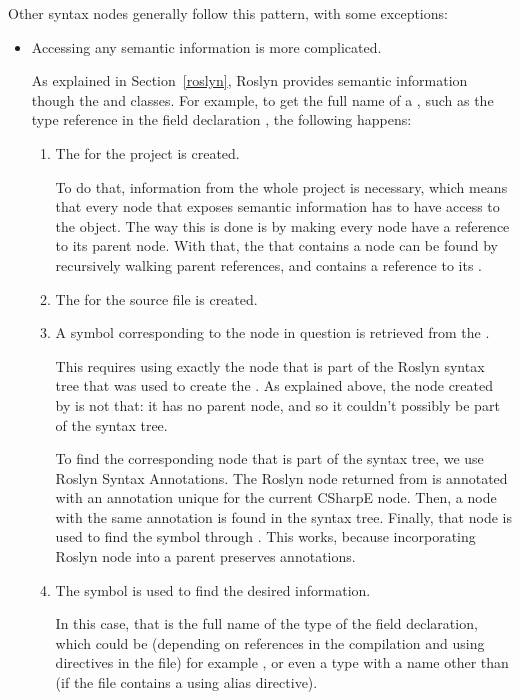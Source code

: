 Other syntax nodes generally follow this pattern, with some exceptions:

\begin{itemize}
\item Accessing any semantic information is more complicated.

As explained in Section~\ref{roslyn}, Roslyn provides semantic information though the  and  classes. For example, to get the full name of a , such as the type reference  in the field declaration , the following happens:

\begin{enumerate}
\item The  for the project is created.

To do that, information from the whole project is necessary, which means that every node that exposes semantic information has to have access to the  object. The way this is done is by making every node have a reference to its parent node. With that, the  that contains a node can be found by recursively walking parent references, and  contains a reference to its .

\item The  for the source file is created.

\item A symbol corresponding to the node in question is retrieved from the .

This requires using exactly the node that is part of the Roslyn syntax tree that was used to create the . As explained above, the node created by  is not that: it has no parent node, and so it couldn't possibly be part of the syntax tree.

To find the corresponding node that is part of the syntax tree, we use Roslyn Syntax Annotations. \cite{roslyn-annotations} The Roslyn node returned from  is annotated with an annotation unique for the current CSharpE node. Then, a node with the same annotation is found in the syntax tree. Finally, that node is used to find the symbol through . This works, because incorporating Roslyn node into a parent preserves annotations.

\item The symbol is used to find the desired information.

In this case, that is the full name of the type of the field declaration, which could be (depending on references in the compilation and using directives in the file) for example ,  or even a type with a name other than  (if the file contains a using alias directive).


\end{enumerate}
\end{itemize}
